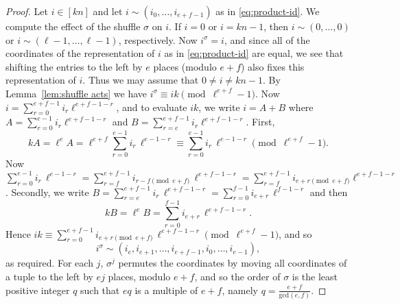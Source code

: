 \documentclass[12pt]{amsart}
\theoremstyle{remark}
\theoremstyle{definition}
\begin{document}
\begin{proof}
Let $i \in [kn]$ and let $i \sim (i_0,\dots,i_{e+f-1})$ as in \eqref{eq:product-id}. We compute the effect of the shuffle $\sigma$ on $i$. If $i = 0$ or $i = kn-1$, then $i \sim (0,\dots,0)$ or $i \sim (\ell-1,\dots,\ell-1)$, respectively. Now $i^\sigma = i$, and since all of the coordinates of the representation of $i$ as in \eqref{eq:product-id} are equal, we see that shifting the entries to the left by $e$ places (modulo $e+f$) also fixes this representation of $i$. Thus we may assume that $0 \neq i \neq kn-1$. By Lemma~\ref{lem:shuffle acts} we have $i^\sigma \equiv ik \pmod{\ell^{e+f} - 1}$. Now $i=\sum_{r=0}^{e+f-1} i_r \ell^{e+f-1-r}$, and to evaluate $ik$, we write $i = A+B$ where $A = \sum_{r=0}^{e-1} i_r \ell^{e+f-1-r}$ and $B=\sum_{r=e}^{e+f-1} i_r \ell^{e+f-1-r}$. First, 
$$kA = \ell^eA = \ell^{e+f} \sum_{r=0}^{e-1}i_r\, \ell^{e-1-r} \equiv \sum_{r=0}^{e-1} i_r\, \ell^{e-1-r} \pmod{\ell^{e+f}-1}.$$
Now $\sum_{r=0}^{e-1} i_r\, \ell^{e-1-r} = \sum_{r=f}^{e+f-1} i_{r-f \pmod{e+f}}\, \ell^{e+f-1-r} = \sum_{r=f}^{e+f-1}i_{e+r \pmod{e+f}}\ell^{e+f-1-r}$.
Secondly, we write $B = \sum_{r=e}^{e+f-1} i_r \, \ell^{e+f-1-r} = \sum_{r=0}^{f-1} i_{e+r}\, \ell^{f-1-r} $ and then
$$
kB = \ell^e B = \sum_{r=0}^{f-1} i_{e+r} \, \ell^{e+f-1-r}.
$$
Hence $ik \equiv \sum_{r=0}^{e+f-1} i_{e+r \pmod{e+f}}\, \ell^{e+f-1-r} \pmod{\ell^{e+f}-1}$, and so
 $$
 i^\sigma \sim (i_e,i_{e+1},\dots,i_{e+f-1},i_0,\dots,i_{e-1}),
 $$
%
as required. For each $j$, $\sigma^j$ permutes the coordinates by moving all coordinates of a tuple to the left by $ej$ places, modulo $e+f$, and so the order of $\sigma$ is the least positive integer $q$ such that $eq$ is a multiple of $e+f$, namely $q = \frac{e+f}{\mathrm{gcd}(e,f)}$.
\end{proof}
\end{document}
